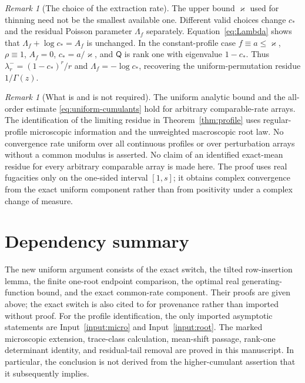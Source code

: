 \documentclass[11pt]{article}
\numberwithin{equation}{section}
\theoremstyle{definition}
\theoremstyle{remark}
\newtheorem{remark}[theorem]{Remark}
\newcommand{\Qop}{\mathsf Q}
\begin{document}
\begin{remark}[The choice of the extraction rate]
The upper bound $\varkappa$ used for thinning need not be the smallest available one. Different valid choices change $c_*$ and the residual Poisson parameter $\Lambda_f$ separately. Equation~\eqref{eq:Lambda} shows that $\Lambda_f+\log c_*=A_f$ is unchanged. In the constant-profile case $f\equiv a\le\varkappa$, $\rho\equiv1$, $A_f=0$, $c_*=a/\varkappa$, and $\Qop$ is rank one with eigenvalue $1-c_*$. Thus $\lambda_r^-=(1-c_*)^r/r$ and $\Lambda_f=-\log c_*$, recovering the uniform-permutation residue $1/\Gamma(z)$.
\end{remark}

\begin{remark}[What is and is not required]
The uniform analytic bound and the all-order estimate \eqref{eq:uniform-cumulants} hold for arbitrary comparable-rate arrays. The identification of the limiting residue in Theorem~\ref{thm:profile} uses regular-profile microscopic information and the unweighted macroscopic root law. No convergence rate uniform over all continuous profiles or over perturbation arrays without a common modulus is asserted. No claim of an identified exact-mean residue for every arbitrary comparable array is made here. The proof uses real fugacities only on the one-sided interval $[1,s]$; it obtains complex convergence from the exact uniform component rather than from positivity under a complex change of measure.
\end{remark}

\section*{Dependency summary}
The new uniform argument consists of the exact switch, the tilted row-insertion lemma, the finite one-root endpoint comparison, the optimal real generating-function bound, and the exact common-rate component. Their proofs are given above; the exact switch is also cited to \cite{LongMeso} for provenance rather than imported without proof. For the profile identification, the only imported asymptotic statements are Input~\ref{input:micro} and Input~\ref{input:root}. The marked microscopic extension, trace-class calculation, mean-shift passage, rank-one determinant identity, and residual-tail removal are proved in this manuscript. In particular, the conclusion is not derived from the higher-cumulant assertion that it subsequently implies.
\end{document}
